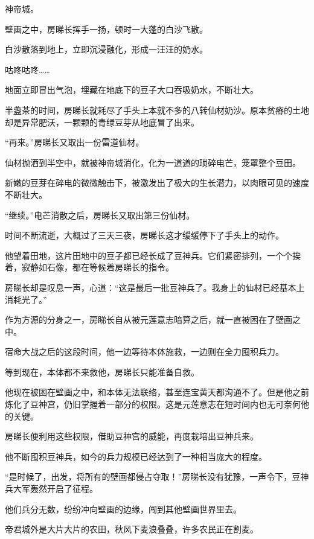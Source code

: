 
\begin{this_body}

神帝城。

壁画之中，房睇长挥手一扬，顿时一大蓬的白沙飞散。

白沙散落到地上，立即沉浸融化，形成一汪汪的奶水。

咕咚咕咚……

地面立即冒出气泡，埋藏在地底下的豆子大口吞吸奶水，不断壮大。

半盏茶的时间，房睇长就耗尽了手头上本就不多的八转仙材奶沙。原本贫瘠的土地却是异常肥沃，一颗颗的青绿豆芽从地底冒了出来。

“再来。”房睇长又取出一份雷道仙材。

仙材抛洒到半空中，就被神帝城消化，化为一道道的琐碎电芒，笼罩整个豆田。

新嫩的豆芽在碎电的微微触击下，被激发出了极大的生长潜力，以肉眼可见的速度不断壮大。

“继续。”电芒消散之后，房睇长又取出第三份仙材。

时间不断流逝，大概过了三天三夜，房睇长这才缓缓停下了手头上的动作。

他望着田地，这片田地中的豆子都已经长成了豆神兵。它们紧密排列，一个个挨着，寂静如石像，都在等候着房睇长的指令。

房睇长却是叹息一声，心道：“这是最后一批豆神兵了。我身上的仙材已经基本上消耗光了。”

作为方源的分身之一，房睇长自从被元莲意志暗算之后，就一直被困在了壁画之中。

宿命大战之后的这段时间，他一边等待本体施救，一边则在全力囤积兵力。

等到现在，本体都不来救他，房睇长只能准备自救。

他现在被困在壁画之中，和本体无法联络，甚至连宝黄天都沟通不了。但是他之前炼化了豆神宫，仍旧掌握着一部分的权限。这是元莲意志在短时间内也无可奈何他的关键。

房睇长便利用这些权限，借助豆神宫的威能，再度栽培出豆神兵来。

他不断囤积豆神兵，如今的兵力规模已经达到了一种相当庞大的程度。

“是时候了，出发，将所有的壁画都侵占夺取！”房睇长没有犹豫，一声令下，豆神兵大军轰然开启了征程。

他们兵分无数，纷纷冲向壁画的边缘，闯到其他壁画世界里去。

帝君城外是大片大片的农田，秋风下麦浪叠叠，许多农民正在割麦。


\end{this_body}
